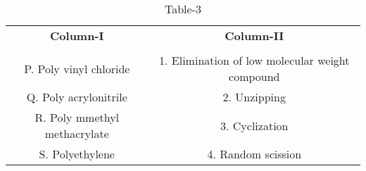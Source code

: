 \begin{table}[htbp]
  \centering
  \caption{Table-3}
  \label{table3}
  \begin{tabular}{cc}
  \textbf{Column-I} & \textbf{Column-II} \\ \\
    P. Poly vinyl chloride & 1. Elimination of low molecular weight compound \\
    Q. Poly acrylonitrile & 2. Unzipping \\
    R. Poly mmethyl methacrylate & 3. Cyclization \\
    S. Polyethylene & 4. Random scission \\
  \end{tabular}
\end{table}
